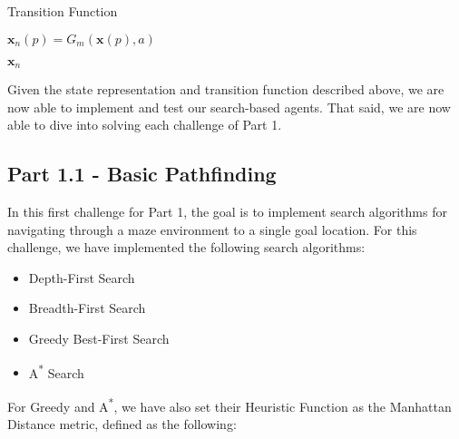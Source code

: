\documentclass{article}[12pt]
\begin{document}
	\begin{algorithm}[H]
	\caption{Transition Function}
		 \;
		 
		 \;
		 
		 $\boldsymbol{x}_n(p) = G_m\left(\boldsymbol{x}(p), a\right)$
		 \;
		 \;
		 
		 \;
		 \Return $\boldsymbol{x}_n$
	\end{algorithm}
	
	Given the state representation and transition function described above, we are now able to implement and test our search-based agents. That said, we are now able to dive into solving each challenge of Part 1.
	
	\subsection{Part 1.1 - Basic Pathfinding}
   In this first challenge for Part 1, the goal is to implement search algorithms for navigating through a maze environment to a single goal location. For this challenge, we have implemented the following search algorithms:
   
   \begin{itemize}
   \item Depth-First Search
   \item Breadth-First Search
   \item Greedy Best-First Search
   \item A\textsuperscript{*} Search
   \end{itemize}
   
   For Greedy and A\textsuperscript{*}, we have also set their Heuristic Function as the Manhattan Distance metric, defined as the following:
   
\end{document}
